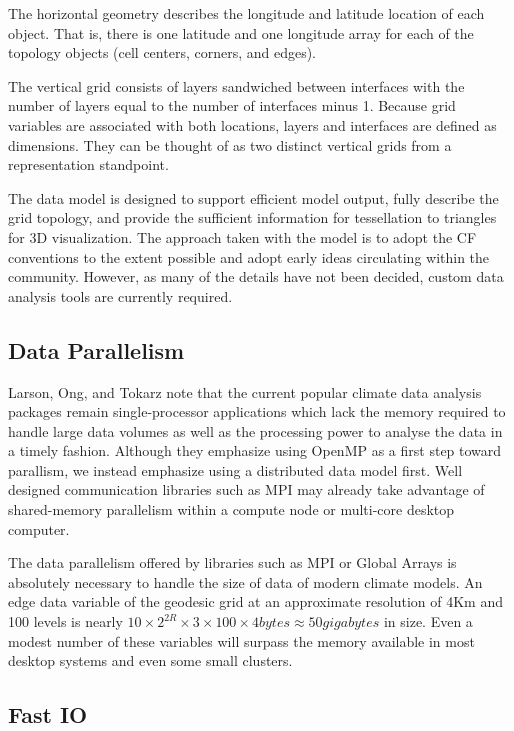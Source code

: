 The horizontal geometry describes the longitude and latitude location of each
object.  That is, there is one latitude and one longitude array for each of
the topology objects (cell centers, corners, and edges).

The vertical grid consists of layers sandwiched between interfaces with the
number of layers equal to the number of interfaces minus 1.   Because grid
variables are associated with both locations, layers and interfaces are
defined as dimensions.  They can be thought of as two distinct vertical grids
from a representation standpoint.

The data model is designed to support efficient model output, fully describe
the grid topology, and provide the sufficient information for tessellation to
triangles for 3D visualization.  The approach taken with the model is to adopt
the CF conventions to the extent possible and adopt early ideas circulating
within the community.  However, as many of the details have not been decided,
custom data analysis tools are currently required.

\subsection{Data Parallelism}

Larson, Ong, and Tokarz note that the current popular climate data analysis
packages remain single-processor applications which lack the memory required
to handle large data volumes as well as the processing power to analyse the
data in a timely fashion.\cite{MODSIM07:LOT}  Although they emphasize using
OpenMP as a first step toward parallism, we instead emphasize using a
distributed data model first.  Well designed communication libraries such as
MPI may already take advantage of shared-memory parallelism within a compute
node or multi-core desktop computer.

The data parallelism offered by libraries such as MPI or Global Arrays is
absolutely necessary to handle the size of data of modern climate models.  An
edge data variable of the geodesic grid at an approximate resolution of 4Km
and 100 levels is nearly $10 \times 2^{2R} \times 3 \times 100 \times 4
\unit{bytes} \approx 50 \unit{gigabytes}$ in size.  Even a modest number of
these variables will surpass the memory available in most desktop systems and
even some small clusters.

\subsection{Fast IO}


